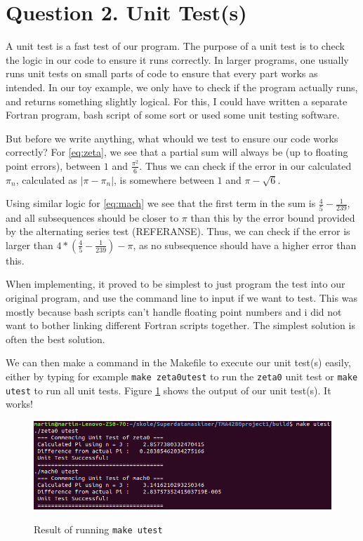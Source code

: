 \documentclass[12pt]{article}
\begin{document}
\section{Question 2. Unit Test(s)}
A unit test is a fast test of our program. The purpose of a 
unit test is to check the logic in our code to ensure it runs correctly.
In larger programs, one usually runs unit tests on small parts of code
to ensure that every part works as intended. In our toy example, we only
have to check if the program actually runs, and returns something slightly logical.
For this, I could have written a separate Fortran program, bash script of some sort or used some unit testing software.

But before we write anything, what whould we test to ensure our code works correctly? For \eqref{eq:zeta}, we see that a partial sum will always be (up to floating point errors), between $1$ and
$\frac{\pi^2}{6}$. Thus we can check if the error in our calculated $\pi_n$, calculated as $|\pi - \pi_n|$, is somewhere between $1$ and $\pi - \sqrt{6}$.

Using similar logic for \eqref{eq:mach}
we see that the first term in the sum is $\frac{4}{5} - \frac{1}{239}$, and all subsequences should be closer to $\pi$ than this by the error bound provided by the
alternating series test (REFERANSE). Thus, we can check if the error is larger than $4 *(\frac{4}{5} - \frac{1}{239}) - \pi$, as no subsequence should have a higher error than this.  

When implementing, it proved to be simplest to just program the test into our original program, and use the command line to input if we want to test. This was mostly because bash scripts can't
handle floating point numbers and i did not want to bother linking different Fortran scripts together. The simplest solution is often the best solution.

We can then make a command in the Makefile to execute our unit test(s) easily, either by typing for example \texttt{make zeta0utest} to run the \texttt{zeta0} unit test or
\texttt{make utest} to run all unit tests. Figure \ref{fig:Q2} shows the output of our unit test(s). It works! 
\begin{figure}[!htb]
    \centering
    \caption{Result of running \texttt{make utest}}
    \includegraphics[width=\textwidth]{Screenshot2}
    \label{fig:Q2}
\end{figure}
\end{document}
